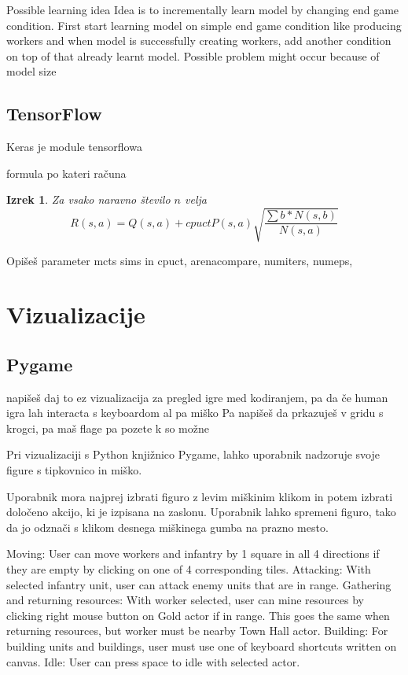 \documentclass[a4paper, 12pt]{book}
\newtheorem{izrek}{Izrek}[chapter]
\begin{document}
Possible learning idea
Idea is to incrementally learn model by changing end game condition. First start learning model on simple end game condition like producing workers and when model is successfully creating workers, add another condition on top of that already learnt model.
Possible problem might occur because of model size



\section{TensorFlow}

Keras je module tensorflowa


formula po kateri računa

\begin{izrek}
	\label{iz:1}
	Za vsako naravno število $n$ velja
	\begin{equation}
	R(s,a) = Q(s,a) + cpuctP(s, a)\sqrt{\dfrac{\sum{b}*N(s,b)}{N(s,a)}}
	\label{eq:1}
	\end{equation}
\end{izrek}


Opišeš parameter mcts sims in cpuct, arenacompare, numiters, numeps, 






\chapter{Vizualizacije}
\label{chvizualizacija}

\section{Pygame}
napišeš daj to ez vizualizacija za pregled igre med kodiranjem, pa da če human igra lah interacta s keyboardom al pa miško
Pa napišeš da prkazuješ v gridu s krogci, pa maš flage pa pozete k so možne


Pri vizualizaciji s Python knjižnico Pygame, lahko uporabnik nadzoruje svoje figure s tipkovnico in miško.

Uporabnik mora najprej izbrati figuro z levim miškinim klikom in potem izbrati določeno akcijo, ki je izpisana na zaslonu. Uporabnik lahko spremeni figuro, tako da jo odznači s klikom desnega miškinega gumba na prazno mesto.


Moving: User can move workers and infantry by 1 square in all 4 directions if they are empty by clicking on one of 4 corresponding tiles.
Attacking: With selected infantry unit, user can attack enemy units that are in range.
Gathering and returning resources: With worker selected, user can mine resources by clicking right mouse button on Gold actor if in range. This goes the same when returning resources, but worker must be nearby Town Hall actor.
Building: For building units and buildings, user must use one of keyboard shortcuts written on canvas.
Idle: User can press space to idle with selected actor.
\end{document}

